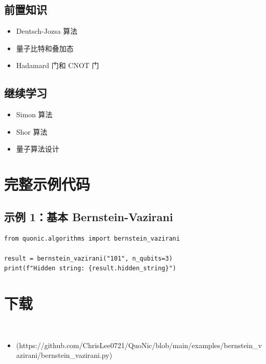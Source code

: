 \documentclass[12pt,a4paper]{article}
\begin{document}
\subsection{前置知识}
\begin{itemize}
  \item Deutsch-Jozsa 算法
  \item 量子比特和叠加态
  \item Hadamard 门和 CNOT 门
\end{itemize}

\subsection{继续学习}
\begin{itemize}
  \item Simon 算法
  \item Shor 算法
  \item 量子算法设计
\end{itemize}

\section{完整示例代码}

\subsection{示例 1：基本 Bernstein-Vazirani}

\begin{lstlisting}[style=python]
from quonic.algorithms import bernstein_vazirani

result = bernstein_vazirani("101", n_qubits=3)
print(f"Hidden string: {result.hidden_string}")
\end{lstlisting}


\section{下载}

\begin{itemize}
  \item [bernstein_vazirani.py](https://github.com/ChrisLee0721/QuoNic/blob/main/examples/bernstein_vazirani/bernstein_vazirani.py)
\end{itemize}
\end{document}
